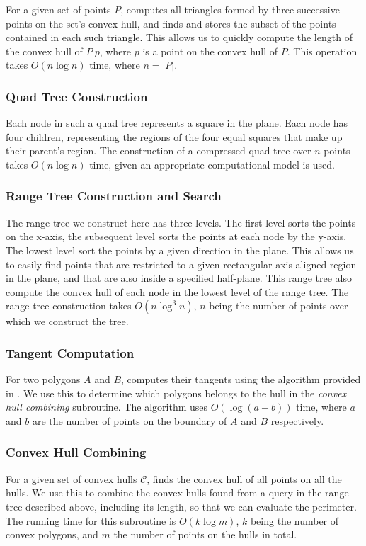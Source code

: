 \documentclass{article}
\begin{document}
For a given set of points $P$, computes all triangles formed by three successive points on the set's convex hull, and finds and stores the subset of the points contained in each such triangle. This allows us to quickly compute the length of the convex hull of $P \ {p}$, where $p$ is a point on the convex hull of $P$. This operation takes $O(n \log n)$ time, where $n = |P|$.
    
\subsubsection{Quad Tree Construction} 

Each node in such a quad tree represents a square in the plane. Each node has four children, representing the regions of the four equal squares that make up their parent's region. The construction of a compressed quad tree over $n$ points takes $O(n \log n)$ time, given an appropriate computational model is used.

\subsubsection{Range Tree Construction and Search}

The range tree we construct here has three levels. The first level sorts the points on the x-axis, the subsequent level sorts the points at each node by the y-axis. The lowest level sort the points by a given direction in the plane. This allows us to easily find points that are restricted to a given rectangular axis-aligned region in the plane, and that are also inside a specified half-plane. This range tree also compute the convex hull of each node in the lowest level of the range tree. The range tree construction takes $O(n\log^3n)$, $n$ being the number of points over which we construct the tree.

\subsubsection{Tangent Computation} \label{subsub:Tangent}

For two polygons $A$ and $B$, computes their tangents using the algorithm provided in \cite{ks95}. We use this to determine which polygons belongs to the hull in the \textit{convex hull combining} subroutine. The algorithm uses $O(\log(a + b))$ time, where $a$ and $b$ are the number of points on the boundary of $A$ and $B$ respectively.

\subsubsection{Convex Hull Combining}
For a given set of convex hulls $\mathcal{C}$, finds the convex hull of all points on all the hulls. We use this to combine the convex hulls found from a query in the range tree described above, including its length, so that we can evaluate the perimeter. The running time for this subroutine is $O(k \log m)$, $k$ being the number of convex polygons, and $m$ the number of points on the hulls in total.
\end{document}
